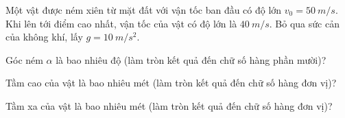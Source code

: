 \begin{vidu}%
Một vật được ném xiên từ mặt đất với vận tốc ban đầu có độ lớn $v_0=50\ m/s$. Khi lên tới điểm cao nhất, vận tốc của vật có độ lớn là $40\ m/s$. Bỏ qua sức cản của không khí, lấy $g=10\ m/s^2$.

\begin{vdc} 
Góc ném $\alpha$ là bao nhiêu độ (làm tròn kết quả đến chữ số hàng phần mười)?
\end{vdc}

\begin{vdc} 
Tầm cao của vật là bao nhiêu mét (làm tròn kết quả đến chữ số hàng đơn vị)?
\end{vdc}


\begin{vdc} 
Tầm xa của vật là bao nhiêu mét  (làm tròn kết quả đến chữ số hàng đơn vị)?
\end{vdc}
\end{vidu}



